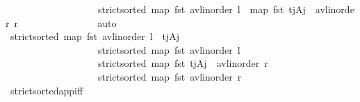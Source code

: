 \begin{isabellebody}
\ \ \ \ \ \ \ \ \ \ \ \ \ \ \ \ \ \ \ {\isachardoublequoteopen}strict{\isacharunderscore}{\kern0pt}sorted\ {\isacharparenleft}{\kern0pt}map\ fst\ {\isacharparenleft}{\kern0pt}avl{\isacharunderscore}{\kern0pt}inorder\ l{\isacharparenright}{\kern0pt}\ {\isacharat}{\kern0pt}\ map\ fst\ {\isacharparenleft}{\kern0pt}{\isacharparenleft}{\kern0pt}t\isactrlsub j{\isacharcomma}{\kern0pt}A\isactrlsub j{\isacharparenright}{\kern0pt}\ {\isacharhash}{\kern0pt}\ avl{\isacharunderscore}{\kern0pt}inorder\ r{\isacharparenright}{\kern0pt}{\isacharparenright}{\kern0pt}{\isachardoublequoteclose}\isanewline
\ \ \ \ \ \ \ \ \ \ \ \ \ \ \isamarkupfalse%
\ auto\isanewline
\ \ \ \ \ \ \ \ \ \ \ \ \isamarkupfalse%
\ \isamarkupfalse%
\ {\isachardoublequoteopen}strict{\isacharunderscore}{\kern0pt}sorted\ {\isacharparenleft}{\kern0pt}map\ fst\ {\isacharparenleft}{\kern0pt}avl{\isacharunderscore}{\kern0pt}inorder\ l\ {\isacharat}{\kern0pt}\ {\isacharbrackleft}{\kern0pt}{\isacharparenleft}{\kern0pt}t\isactrlsub j{\isacharcomma}{\kern0pt}A\isactrlsub j{\isacharparenright}{\kern0pt}{\isacharbrackright}{\kern0pt}{\isacharparenright}{\kern0pt}{\isacharparenright}{\kern0pt}{\isachardoublequoteclose}\ \isanewline
\ \ \ \ \ \ \ \ \ \ \ \ \ \ \ \ \ \ \ {\isachardoublequoteopen}strict{\isacharunderscore}{\kern0pt}sorted\ {\isacharparenleft}{\kern0pt}map\ fst\ {\isacharparenleft}{\kern0pt}avl{\isacharunderscore}{\kern0pt}inorder\ l{\isacharparenright}{\kern0pt}{\isacharparenright}{\kern0pt}{\isachardoublequoteclose}\isanewline
\ \ \ \ \ \ \ \ \ \ \ \ \ \ \ \ \ \ \ {\isachardoublequoteopen}strict{\isacharunderscore}{\kern0pt}sorted\ {\isacharparenleft}{\kern0pt}map\ fst\ {\isacharparenleft}{\kern0pt}{\isacharparenleft}{\kern0pt}t\isactrlsub j{\isacharcomma}{\kern0pt}A\isactrlsub j{\isacharparenright}{\kern0pt}\ {\isacharhash}{\kern0pt}\ avl{\isacharunderscore}{\kern0pt}inorder\ r{\isacharparenright}{\kern0pt}{\isacharparenright}{\kern0pt}{\isachardoublequoteclose}\isanewline
\ \ \ \ \ \ \ \ \ \ \ \ \ \ \ \ \ \ \ {\isachardoublequoteopen}strict{\isacharunderscore}{\kern0pt}sorted\ {\isacharparenleft}{\kern0pt}map\ fst\ {\isacharparenleft}{\kern0pt}avl{\isacharunderscore}{\kern0pt}inorder\ r{\isacharparenright}{\kern0pt}{\isacharparenright}{\kern0pt}{\isachardoublequoteclose}\isanewline
\ \ \ \ \ \ \ \ \ \ \ \ \ \ \isamarkupfalse%
\ strict{\isacharunderscore}{\kern0pt}sorted{\isacharunderscore}{\kern0pt}app{\isacharunderscore}{\kern0pt}iff\ \isamarkupfalse%

\end{isabellebody}
